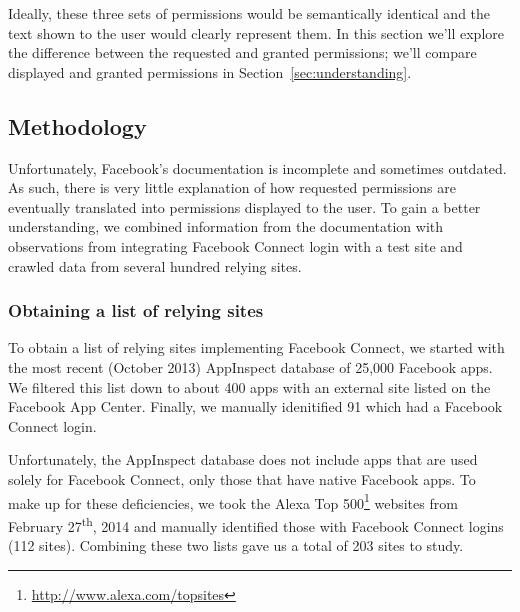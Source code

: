 \documentclass{sig-alternate}
\begin{document}
Ideally, these three sets of permissions would be semantically identical and the text shown to the user would clearly represent them. In this section we'll explore the difference between the requested and granted permissions; we'll compare displayed and granted permissions in Section~\ref{sec:understanding}.

\subsection{Methodology}

Unfortunately, Facebook's documentation \cite{fbdocs} is incomplete and sometimes outdated. 
As such, there is very little explanation of how requested permissions are eventually translated into permissions displayed to the user.
To gain a better understanding, we combined information from the documentation with observations from integrating Facebook Connect login with a test site and crawled data from several hundred relying sites.

\subsubsection{Obtaining a list of relying sites}

To obtain a list of relying sites implementing Facebook Connect, we started with the most recent (October 2013) AppInspect \cite{appinspect} database of 25,000 Facebook apps.
We filtered this list down to about 400 apps with an external site listed on the Facebook App Center.
Finally, we manually idenitified 91 which had a Facebook Connect login.

Unfortunately, the AppInspect database does not include apps that are used solely for Facebook Connect, only those that have native Facebook apps. 
To make up for these deficiencies, we took the Alexa Top 500\footnote{\url{http://www.alexa.com/topsites}} websites from February 27\textsuperscript{th}, 2014 and manually identified those with Facebook Connect logins (112 sites). 
Combining these two lists gave us a total of 203 sites to study.
\end{document}
